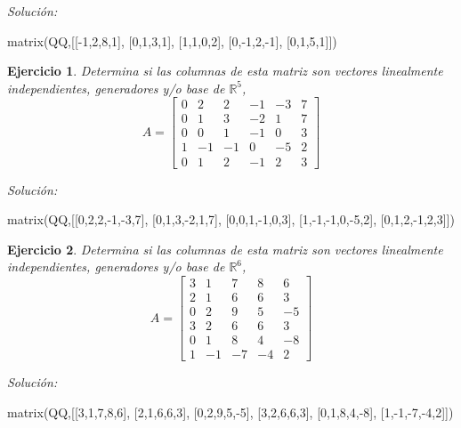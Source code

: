 \documentclass{amsart}
\newtheorem{ejer}{Ejercicio}
\begin{document}
{\it Soluci\'on:}

\begin{sageblock}
matrix(QQ,[[-1,2,8,1],
[0,1,3,1],
[1,1,0,2],
[0,-1,2,-1],
[0,1,5,1]])
\end{sageblock}



\begin{ejer} Determina si las columnas de esta matriz son vectores linealmente independientes, generadores y/o base de ${{\mathbb R}}^{5}$,
\[ A = \left[\begin{array}{rrrrrr}
0 & 2 & 2 & -1 & -3 & 7 \\
0 & 1 & 3 & -2 & 1 & 7 \\
0 & 0 & 1 & -1 & 0 & 3 \\
1 & -1 & -1 & 0 & -5 & 2 \\
0 & 1 & 2 & -1 & 2 & 3
\end{array}\right] \]
\end{ejer}

{\it Soluci\'on:}

\begin{sageblock}
matrix(QQ,[[0,2,2,-1,-3,7],
[0,1,3,-2,1,7],
[0,0,1,-1,0,3],
[1,-1,-1,0,-5,2],
[0,1,2,-1,2,3]])
\end{sageblock}



\begin{ejer} Determina si las columnas de esta matriz son vectores linealmente independientes, generadores y/o base de ${{\mathbb R}}^{6}$,
\[ A = \left[\begin{array}{rrrrr}
3 & 1 & 7 & 8 & 6 \\
2 & 1 & 6 & 6 & 3 \\
0 & 2 & 9 & 5 & -5 \\
3 & 2 & 6 & 6 & 3 \\
0 & 1 & 8 & 4 & -8 \\
1 & -1 & -7 & -4 & 2
\end{array}\right] \]
\end{ejer}

{\it Soluci\'on:}

\begin{sageblock}
matrix(QQ,[[3,1,7,8,6],
[2,1,6,6,3],
[0,2,9,5,-5],
[3,2,6,6,3],
[0,1,8,4,-8],
[1,-1,-7,-4,2]])
\end{sageblock}
\end{document}
